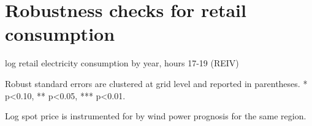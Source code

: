 \section{Robustness checks for retail consumption}
\label{app:robustness_retail}

\begin{table}[H]
\begin{threeparttable}
  \centering
  \caption{log retail electricity consumption by year, hours 17-19 (REIV)}
  \label{tab:r_year}
  \footnotesize
    
    \begin{tablenotes}
    \item Robust standard errors are clustered at grid level and reported in parentheses. * p<0.10, ** p<0.05, *** p<0.01.
    \item Log spot price is instrumented for by wind power prognosis for the same region.
  \end{tablenotes}
\end{threeparttable}
\end{table}
